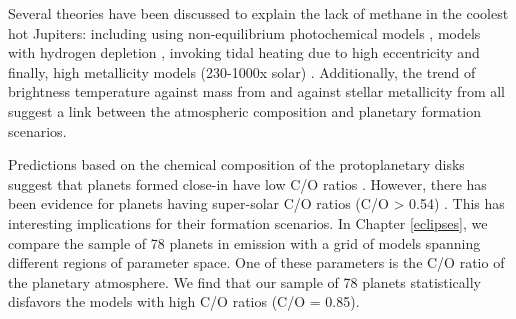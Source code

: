 Several theories have been discussed to explain the lack of methane in the coolest hot Jupiters: including using non-equilibrium photochemical models \citep{Line2011}, models with hydrogen depletion \citep{Hu2015}, invoking tidal heating due to high eccentricity \citep{Agundez2014} and finally, high metallicity models (230-1000x solar) \citep{Moses2013b}. Additionally, the trend of brightness temperature against mass from \citet{Kammer2015} and against stellar metallicity from \citet{Wallack2019} all suggest a link between the atmospheric composition and planetary formation scenarios.

Predictions based on the chemical composition of the protoplanetary disks suggest that planets formed close-in have low C/O ratios \citep[e.g.,][]{Oberg2011,Eistrup2018}. However, there has been evidence for planets having super-solar C/O ratios (C/O > 0.54) \citep[e.g.,][]{Lodders2004,Madhusudhan2011}. This has interesting implications for their formation scenarios. In Chapter \ref{eclipses}, we compare the sample of 78 planets in emission with a grid of models spanning different regions of parameter space. One of these parameters is the C/O ratio of the planetary atmosphere. We find that our sample of 78 planets statistically disfavors the models with high C/O ratios (C/O = 0.85).



